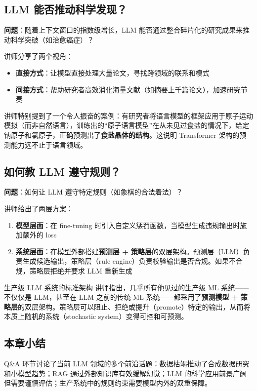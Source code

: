 \subsection{LLM 能否推动科学发现？}

\textbf{问题}：随着上下文窗口的指数级增长，LLM 能否通过整合碎片化的研究成果来推动科学突破（如治愈癌症）？

讲师分享了两个视角：
\begin{itemize}
    \item \textbf{直接方式}：让模型直接处理大量论文，寻找跨领域的联系和模式
    \item \textbf{间接方式}：帮助研究者高效消化海量文献（如摘要上千篇论文），加速研究节奏
\end{itemize}

讲师特别提到了一个令人振奋的案例：有研究者将语言模型的框架应用于原子运动模拟（而非自然语言），训练出的``原子语言模型''在从未见过食盐的情况下，给定钠原子和氯原子，正确预测出了\textbf{食盐晶体的结构}。这说明 Transformer 架构的预测能力远不止于语言领域。

\subsection{如何教 LLM 遵守规则？}

\textbf{问题}：如何让 LLM 遵守特定规则（如象棋的合法着法）？

讲师给出了两层方案：

\begin{enumerate}
    \item \textbf{模型层面}：在 fine-tuning 时引入自定义惩罚函数，当模型生成违规输出时施加额外的 loss
    \item \textbf{系统层面}：在模型外部搭建\textbf{预测层 + 策略层}的双层架构。预测层（LLM）负责生成候选输出，策略层（rule engine）负责校验输出是否合规。如果不合规，策略层拒绝并要求 LLM 重新生成
\end{enumerate}

\begin{knowledgebox}{生产级 LLM 系统的标准架构}
讲师指出，几乎所有他见过的生产级 ML 系统——不仅仅是 LLM，甚至在 LLM 之前的传统 ML 系统——都采用了\textbf{预测模型 + 策略层}的双层架构。策略层可以阻止、拒绝或提升（promote）特定的输出，从而将本质上随机的系统（stochastic system）变得可控和可预测。
\end{knowledgebox}

\subsection{本章小结}

Q\&A 环节讨论了当前 LLM 领域的多个前沿话题：数据枯竭推动了合成数据研究和小模型趋势；RAG 通过外部知识库有效缓解幻觉；LLM 的科学应用前景广阔但需要谨慎评估；生产系统中的规则约束需要模型内外的双重保障。

